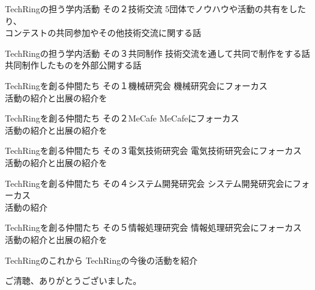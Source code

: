 \documentclass[dvipdfmx]{beamer}
\begin{document}
\begin{frame}{TechRingの担う学内活動 その２}{技術交流}
  5団体でノウハウや活動の共有をしたり、\\
  コンテストの共同参加やその他技術交流に関する話
\end{frame}

\begin{frame}{TechRingの担う学内活動 その３}{共同制作}
  技術交流を通して共同で制作をする話\\
  共同制作したものを外部公開する話
\end{frame}

\begin{frame}{TechRingを創る仲間たち その１}{機械研究会}
  機械研究会にフォーカス\\
  活動の紹介と出展の紹介を
\end{frame}

\begin{frame}{TechRingを創る仲間たち その２}{MeCafe}
  MeCafeにフォーカス\\
  活動の紹介と出展の紹介を
\end{frame}

\begin{frame}{TechRingを創る仲間たち その３}{電気技術研究会}
  電気技術研究会にフォーカス\\
  活動の紹介と出展の紹介を
\end{frame}

\begin{frame}{TechRingを創る仲間たち その４}{システム開発研究会}
  システム開発研究会にフォーカス\\
  活動の紹介
\end{frame}

\begin{frame}{TechRingを創る仲間たち その５}{情報処理研究会}
  情報処理研究会にフォーカス\\
  活動の紹介と出展の紹介を
\end{frame}

\begin{frame}{TechRingのこれから}
  TechRingの今後の活動を紹介
\end{frame}

\begin{frame}
  \begin{Large}
    ご清聴、ありがとうございました。
  \end{Large}
\end{frame}
\end{document}
